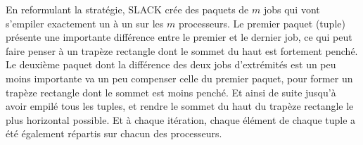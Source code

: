 \documentclass[a4paper,12pt]{report}
\theoremstyle{plain}				%
\theoremstyle{definition}				%
\begin{document}
En reformulant la stratégie, SLACK crée des paquets de $m$ jobs qui vont s'empiler exactement un à un 
  sur les $m$ processeurs. 
Le premier paquet (tuple) présente une importante différence entre le premier et le dernier job, 
  ce qui peut faire penser à un trapèze rectangle dont le sommet du haut est fortement penché. 
Le deuxième paquet dont la différence des deux jobs d'extrémités est un peu moins importante 
  va un peu compenser celle du premier paquet, pour former un trapèze rectangle dont le sommet 
  est moins penché. 
Et ainsi de suite jusqu'à avoir empilé tous les tuples, et rendre le sommet du haut du trapèze rectangle le plus horizontal possible. Et à chaque itération, chaque élément de chaque tuple a été également répartis sur chacun des processeurs.

\end{document}
